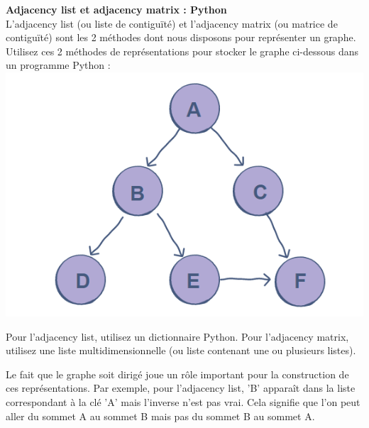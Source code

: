 \begin{Exercice}[10 minutes]  \textbf{Adjacency list et adjacency matrix : Python}\\
    L'adjacency list (ou liste de contiguïté) et l'adjacency matrix (ou matrice de contiguïté) sont les 2 méthodes dont nous disposons pour représenter un graphe. Utilisez ces 2 méthodes de représentations pour stocker le graphe ci-dessous dans un programme Python :\\
    \includegraphics[]{resources/Graphe1.PNG}   

    \begin{conseil}
    Pour l'adjacency list, utilisez un dictionnaire Python. Pour l'adjacency matrix, utilisez une liste multidimensionnelle (ou liste contenant une ou plusieurs listes).
    \end{conseil}
    \begin{solution}
        
        Le fait que le graphe soit dirigé joue un rôle important pour la construction de ces représentations. Par exemple, pour l'adjacency list, 'B' apparaît dans la liste correspondant à la clé 'A' mais l'inverse n'est pas vrai. Cela signifie que l'on peut aller du sommet A au sommet B mais pas du sommet B au sommet A.\\
    \end{solution}
\end{Exercice}


